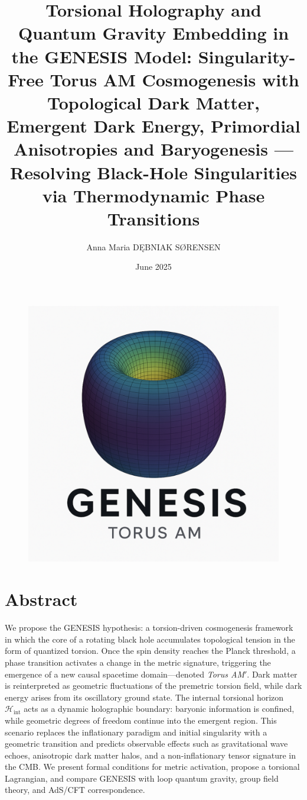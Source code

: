 \documentclass{article}
\title{Torsional Holography and Quantum Gravity Embedding in the GENESIS Model: Singularity-Free Torus AM Cosmogenesis with Topological Dark Matter, Emergent Dark Energy, Primordial Anisotropies and Baryogenesis — Resolving Black-Hole Singularities via Thermodynamic Phase Transitions}
\author{Anna Maria DĘBNIAK SØRENSEN}
\date{June 2025}
\begin{document}
\begin{figure}
    \centering
    \includegraphics[width=0.5\linewidth]{TorusAM.png}
\end{figure}

\maketitle
\clearpage

\section*{Abstract}
We propose the GENESIS hypothesis: a torsion-driven cosmogenesis framework in which the core of a rotating black hole accumulates topological tension in the form of quantized torsion. Once the spin density reaches the Planck threshold, a phase transition activates a change in the metric signature, triggering the emergence of a new causal spacetime domain—denoted \emph{Torus AM$'$}. Dark matter is reinterpreted as geometric fluctuations of the premetric torsion field, while dark energy arises from its oscillatory ground state. The internal torsional horizon $\mathcal{H}_{\mathrm{int}}$ acts as a dynamic holographic boundary: baryonic information is confined, while geometric degrees of freedom continue into the emergent region. This scenario replaces the inflationary paradigm and initial singularity with a geometric transition and predicts observable effects such as gravitational wave echoes, anisotropic dark matter halos, and a non-inflationary tensor signature in the CMB. We present formal conditions for metric activation, propose a torsional Lagrangian, and compare GENESIS with loop quantum gravity, group field theory, and AdS/CFT correspondence.
\end{document}
